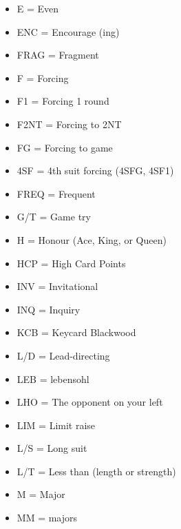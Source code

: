\documentclass[a4paper]{article}
\begin{document}
\begin{itemize}
\item E            = Even

\item ENC          = Encourage (ing)

\item FRAG         = Fragment

\item F            = Forcing

\item F1           = Forcing 1 round

\item F2NT         = Forcing to 2NT

\item FG           = Forcing to game

\item 4SF          = 4th suit forcing (4SFG, 4SF1)

\item FREQ         = Frequent

\item G/T          = Game try

\item H            = Honour (Ace, King, or Queen)

\item HCP          = High Card Points

\item INV          = Invitational

\item INQ          = Inquiry

\item KCB          = Keycard Blackwood

\item L/D          = Lead-directing

\item LEB          = lebensohl

\item LHO          = The opponent on your left

\item LIM          = Limit raise

\item L/S          = Long suit

\item L/T          = Less than (length or strength)

\item M            = Major

\item MM           = majors


\end{itemize}
\end{document}
